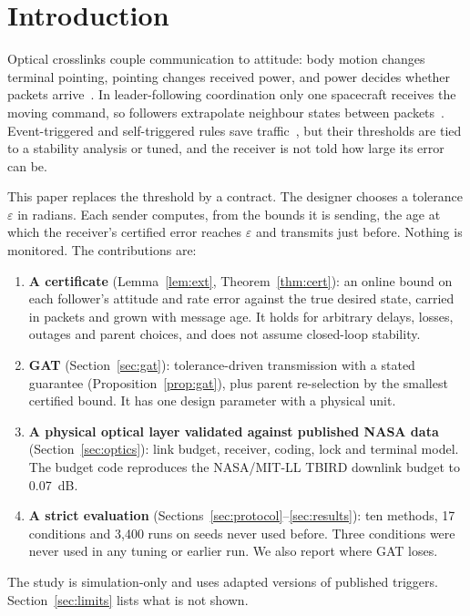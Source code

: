 \documentclass[journal]{IEEEtran}
\begin{document}
\section{Introduction}
Optical crosslinks couple communication to attitude: body motion changes terminal pointing, pointing changes received power, and power decides whether packets arrive~\cite{click}. In leader-following coordination only one spacecraft receives the moving command, so followers extrapolate neighbour states between packets~\cite{cai2014,dimarogonas2009}. Event-triggered and self-triggered rules save traffic~\cite{tabuada2007,heemels2012,girard2015,mazo2010,xie2023,xie2024taes,wang2021,jia2023}, but their thresholds are tied to a stability analysis or tuned, and the receiver is not told how large its error can be.

This paper replaces the threshold by a contract. The designer chooses a tolerance $\varepsilon$ in radians. Each sender computes, from the bounds it is sending, the age at which the receiver's certified error reaches $\varepsilon$ and transmits just before. Nothing is monitored. The contributions are:
\begin{enumerate}
\item \textbf{A certificate} (Lemma~\ref{lem:ext}, Theorem~\ref{thm:cert}): an online bound on each follower's attitude and rate error against the true desired state, carried in packets and grown with message age. It holds for arbitrary delays, losses, outages and parent choices, and does not assume closed-loop stability.
\item \textbf{GAT} (Section~\ref{sec:gat}): tolerance-driven transmission with a stated guarantee (Proposition~\ref{prop:gat}), plus parent re-selection by the smallest certified bound. It has one design parameter with a physical unit.
\item \textbf{A physical optical layer validated against published NASA data} (Section~\ref{sec:optics}): link budget, receiver, coding, lock and terminal model. The budget code reproduces the NASA/MIT-LL TBIRD downlink budget to 0.07~dB.
\item \textbf{A strict evaluation} (Sections~\ref{sec:protocol}--\ref{sec:results}): ten methods, 17 conditions and 3{,}400 runs on seeds never used before. Three conditions were never used in any tuning or earlier run. We also report where GAT loses.
\end{enumerate}
The study is simulation-only and uses adapted versions of published triggers. Section~\ref{sec:limits} lists what is not shown.
\end{document}
